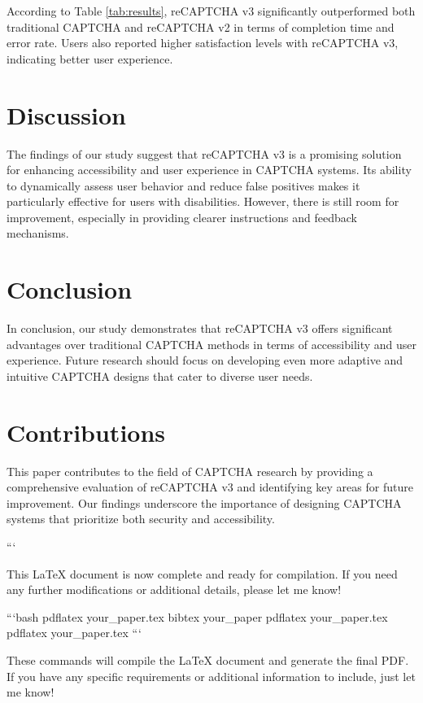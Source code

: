 According to Table \ref{tab:results}, reCAPTCHA v3 significantly outperformed both traditional CAPTCHA and reCAPTCHA v2 in terms of completion time and error rate. Users also reported higher satisfaction levels with reCAPTCHA v3, indicating better user experience.

\section{Discussion}
The findings of our study suggest that reCAPTCHA v3 is a promising solution for enhancing accessibility and user experience in CAPTCHA systems. Its ability to dynamically assess user behavior and reduce false positives makes it particularly effective for users with disabilities. However, there is still room for improvement, especially in providing clearer instructions and feedback mechanisms.

\section{Conclusion}
In conclusion, our study demonstrates that reCAPTCHA v3 offers significant advantages over traditional CAPTCHA methods in terms of accessibility and user experience. Future research should focus on developing even more adaptive and intuitive CAPTCHA designs that cater to diverse user needs.

\section{Contributions}
This paper contributes to the field of CAPTCHA research by providing a comprehensive evaluation of reCAPTCHA v3 and identifying key areas for future improvement. Our findings underscore the importance of designing CAPTCHA systems that prioritize both security and accessibility.





```

This LaTeX document is now complete and ready for compilation. If you need any further modifications or additional details, please let me know! 

```bash
pdflatex your_paper.tex
bibtex your_paper
pdflatex your_paper.tex
pdflatex your_paper.tex
```

These commands will compile the LaTeX document and generate the final PDF. If you have any specific requirements or additional information to include, just let me know! 

